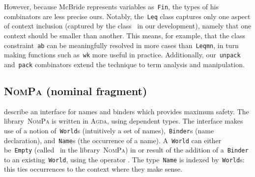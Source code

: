 \documentclass[9pt,preprint,authoryear]{sigplanconf}
\begin{document}
%
However, because McBride represents variables as{~}\textcolor[rgb]{0,0,0.80}{\texttt{Fin}}, the types
    of his combinators are less precise ours. Notably, the{~}\textcolor[rgb]{0,0,0.80}{\texttt{Leq}}    class captures only one aspect of context inclusion (captured
    by the class{~}\textcolor[rgb]{0,0,0.80}{\texttt{\makebox[1.83ex][c]{$ \subseteq $}}} in our development), namely that one context
    should be smaller than another. This means, for example, that the
    class constraint{~}\textcolor[rgb]{0,0,0.80}{\texttt{a}}\textcolor[rgb]{0,0,0.80}{\texttt{\mbox{\hspace{0.50em}}}}\textcolor[rgb]{0,0,0.80}{\texttt{\makebox[1.83ex][c]{$ \subseteq $}}}\textcolor[rgb]{0,0,0.80}{\texttt{\mbox{\hspace{0.50em}}}}\textcolor[rgb]{0,0,0.80}{\texttt{b}} can be meaningfully resolved in more
    cases than{~}\textcolor[rgb]{0,0,0.80}{\texttt{Leq}}\textcolor[rgb]{0,0,0.80}{\texttt{\mbox{\hspace{0.50em}}}}\textcolor[rgb]{0,0,0.80}{\texttt{m}}\textcolor[rgb]{0,0,0.80}{\texttt{\mbox{\hspace{0.50em}}}}\textcolor[rgb]{0,0,0.80}{\texttt{n}}, in turn making functions such as{~}\textcolor[rgb]{0,0,0.80}{\texttt{wk}}    more useful in practice. Additionally, our{~}\textcolor[rgb]{0,0,0.80}{\texttt{unpack}} and{~}\textcolor[rgb]{0,0,0.80}{\texttt{pack}}    combinators extend the technique to term analysis and manipulation.%


\subsection{\textsc{NomPa} (nominal fragment)}

%
\citet{pouillard_unified_2012} describe an interface for names and
    binders which provides maximum safety. The library{~}\textsc{NomPa} is
    written in \textsc{Agda}, using dependent types. The interface makes use
    of a notion of{~}\textcolor[rgb]{0,0,0.80}{\texttt{World}}s (intuitively a set of names),{~}\textcolor[rgb]{0,0,0.80}{\texttt{Binder}}s
    (name declaration), and{~}\textcolor[rgb]{0,0,0.80}{\texttt{Name}}s (the occurrence of a name).
    A{~}\textcolor[rgb]{0,0,0.80}{\texttt{World}}   can   either   be{~}\textcolor[rgb]{0,0,0.80}{\texttt{Empty}}   (called{~}\textcolor[rgb]{0,0,0.80}{\texttt{\makebox[1.22ex][c]{$ \emptyset $}}}   in   the
    library{~}\textsc{NomPa}) in or  result of the addition  of a{~}\textcolor[rgb]{0,0,0.80}{\texttt{Binder}} to
    an existing{~}\textcolor[rgb]{0,0,0.80}{\texttt{World}}, using the operator \textcolor[cmyk]{0,0.65,0.99,0}{\texttt{\makebox[1.22ex][l]{$ {(} $}}}\textcolor[rgb]{0,0,0.80}{\texttt{\makebox[1.22ex][c]{\ensuremath{\triangleleft}}}}\textcolor[cmyk]{0,0.65,0.99,0}{\texttt{\makebox[1.22ex][r]{$ {)} $}}}. The type{~}\textcolor[rgb]{0,0,0.80}{\texttt{Name}}    is indexed by{~}\textcolor[rgb]{0,0,0.80}{\texttt{World}}s{:} this ties occurrences to the context where
    they make sense.%
\end{document}
